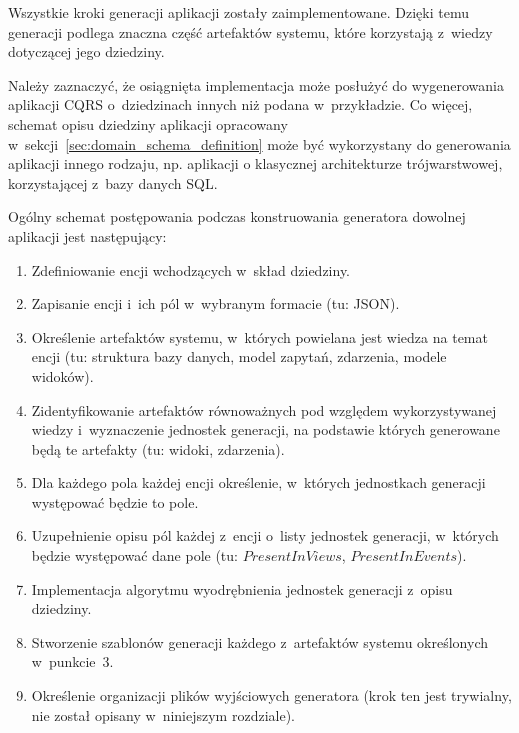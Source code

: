 Wszystkie kroki generacji aplikacji zostały zaimplementowane.
Dzięki temu generacji podlega znaczna część artefaktów systemu, które korzystają z~wiedzy dotyczącej jego dziedziny.

Należy zaznaczyć, że osiągnięta implementacja może posłużyć do wygenerowania aplikacji CQRS o~dziedzinach innych niż podana w~przykładzie.
Co więcej, schemat opisu dziedziny aplikacji opracowany w~sekcji~\ref{sec:domain_schema_definition} może być wykorzystany do generowania aplikacji innego rodzaju, np. aplikacji o klasycznej architekturze trójwarstwowej, korzystającej z~bazy danych SQL.

Ogólny schemat postępowania podczas konstruowania generatora dowolnej aplikacji jest następujący:

\begin{enumerate}
 \item Zdefiniowanie encji wchodzących w~skład dziedziny.
 \item Zapisanie encji i~ich pól w~wybranym formacie (tu: JSON).
 \item Określenie artefaktów systemu, w~których powielana jest wiedza na temat encji (tu: struktura bazy danych, model zapytań, zdarzenia, modele widoków).
 \item Zidentyfikowanie artefaktów równoważnych pod względem wykorzystywanej wiedzy i~wyznaczenie jednostek generacji, na podstawie których generowane będą te artefakty (tu: widoki, zdarzenia).
 \item Dla każdego pola każdej encji określenie, w~których jednostkach generacji występować będzie to pole.
 \item Uzupełnienie opisu pól każdej z~encji o~listy jednostek generacji, w~których będzie występować dane pole (tu: $PresentInViews$, $PresentInEvents$).
 \item Implementacja algorytmu wyodrębnienia jednostek generacji z~opisu dziedziny.
 \item Stworzenie szablonów generacji każdego z~artefaktów systemu określonych w~punkcie~3.
 \item Określenie organizacji plików wyjściowych generatora (krok ten jest trywialny, nie został opisany w~niniejszym rozdziale).
\end{enumerate}
